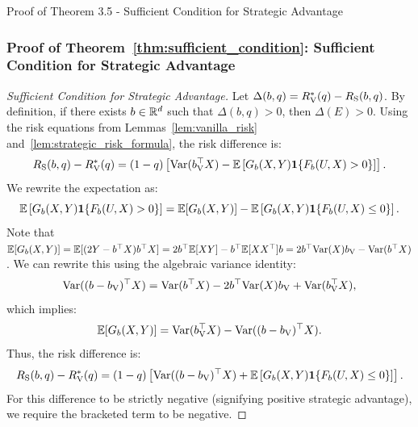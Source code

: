 \begin{sourceblock}{Proof of Theorem 3.5 - Sufficient Condition for Strategic Advantage}
\subsubsection*{Proof of Theorem~\ref{thm:sufficient_condition}: Sufficient Condition for Strategic Advantage}
\label{app:proof_sufficient_condition}
\begin{proof}[Sufficient Condition for Strategic Advantage]
Let $\Delta(b, q) = R_{\mathrm{V}}^*(q) - R_{\mathrm{S}}(b, q)$. By definition, if there exists $b \in \mathbb{R}^d$ such that $\Delta(b, q) > 0$, then $\Delta(E) > 0$. Using the risk equations from Lemmas~\ref{lem:vanilla_risk} and~\ref{lem:strategic_risk_formula}, the risk difference is:
\begin{equation}
    R_{\mathrm{S}}(b, q) - R_{\mathrm{V}}^*(q) = (1 - q) \left[ \mathrm{Var}(b_{\mathrm{V}}^\top X) - \mathbb{E}\left[ G_b(X, Y) \mathbf{1}\{F_b(U, X) > 0\} \right] \right].
\end{equation}
We rewrite the expectation as:
\begin{equation}
    \mathbb{E}\left[ G_b(X, Y) \mathbf{1}\{F_b(U, X) > 0\} \right] = \mathbb{E}[G_b(X, Y)] - \mathbb{E}\left[ G_b(X, Y) \mathbf{1}\{F_b(U, X) \le 0\} \right].
\end{equation}
Note that $\mathbb{E}[G_b(X, Y)] = \mathbb{E}[(2Y - b^\top X)b^\top X] = 2b^\top \mathbb{E}[XY] - b^\top \mathbb{E}[XX^\top]b = 2b^\top \mathrm{Var}(X)b_{\mathrm{V}} - \mathrm{Var}(b^\top X)$. We can rewrite this using the algebraic variance identity:
\begin{equation}
    \mathrm{Var}((b - b_{\mathrm{V}})^\top X) = \mathrm{Var}(b^\top X) - 2b^\top \mathrm{Var}(X)b_{\mathrm{V}} + \mathrm{Var}(b_{\mathrm{V}}^\top X),
\end{equation}
which implies:
\begin{equation}
    \mathbb{E}[G_b(X, Y)] = \mathrm{Var}(b_{\mathrm{V}}^\top X) - \mathrm{Var}((b - b_{\mathrm{V}})^\top X).
\end{equation}
Thus, the risk difference is:
\begin{equation}
    R_{\mathrm{S}}(b, q) - R_{\mathrm{V}}^*(q) = (1 - q) \left[ \mathrm{Var}((b - b_{\mathrm{V}})^\top X) + \mathbb{E}\left[ G_b(X, Y) \mathbf{1}\{F_b(U, X) \le 0\} \right] \right].
\end{equation}
For this difference to be strictly negative (signifying positive strategic advantage), we require the bracketed term to be negative. 


\end{proof}
\end{sourceblock}
